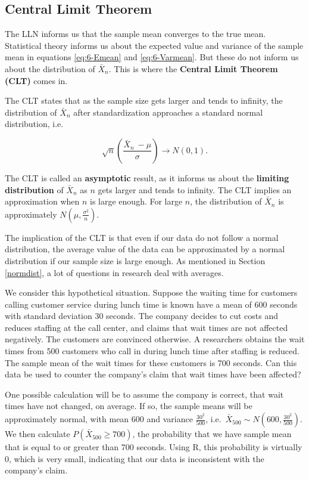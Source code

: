 \documentclass[
]{book}
\begin{document}
\hypertarget{CLT}{%
\subsection{Central Limit Theorem}\label{CLT}}

The LLN informs us that the sample mean converges to the true mean. Statistical theory informs us about the expected value and variance of the sample mean in equations \eqref{eq:6-Emean} and \eqref{eq:6-Varmean}. But these do not inform us about the distribution of \(\bar{X}_n\). This is where the \textbf{Central Limit Theorem (CLT)} comes in.

The CLT states that as the sample size gets larger and tends to infinity, the distribution of \(\bar{X}_n\) after standardization approaches a standard normal distribution, i.e.

\begin{equation} 
\sqrt{n} \left(\frac{\bar{X}_n \ - \mu}{\sigma} \right) \to N(0,1).
\label{eq:6-CLT}
\end{equation}

The CLT is called an \textbf{asymptotic} result, as it informs us about the \textbf{limiting distribution} of \(\bar{X}_n\) as \(n\) gets larger and tends to infinity. The CLT implies an approximation when \(n\) is large enough. For large \(n\), the distribution of \(\bar{X}_n\) is approximately \(N(\mu, \frac{\sigma^2}{n})\).

The implication of the CLT is that even if our data do not follow a normal distribution, the average value of the data can be approximated by a normal distribution if our sample size is large enough. As mentioned in Section \ref{normdist}, a lot of questions in research deal with averages.

We consider this hypothetical situation. Suppose the waiting time for customers calling customer service during lunch time is known have a mean of 600 seconds with standard deviation 30 seconds. The company decides to cut costs and reduces staffing at the call center, and claims that wait times are not affected negatively. The customers are convinced otherwise. A researchers obtains the wait times from 500 customers who call in during lunch time after staffing is reduced. The sample mean of the wait times for these customers is 700 seconds. Can this data be used to counter the company's claim that wait times have been affected?

One possible calculation will be to assume the company is correct, that wait times have not changed, on average. If so, the sample means will be approximately normal, with mean 600 and variance \(\frac{30^2}{500}\), i.e.~\(\bar{X}_{500} \sim N(600, \frac{30^2}{500})\). We then calculate \(P(\bar{X}_{500} \geq 700)\), the probability that we have sample mean that is equal to or greater than 700 seconds. Using R, this probability is virtually 0, which is very small, indicating that our data is inconsistent with the company's claim.
\end{document}
